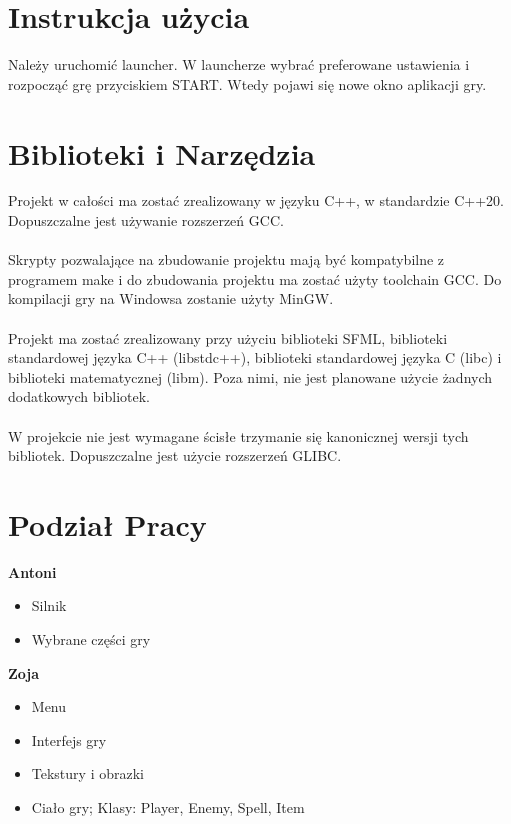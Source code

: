 \documentclass[12pt, titlepage]{article}
\begin{document}
\newpage
\section{Instrukcja użycia}
Należy uruchomić launcher. W
launcherze wybrać preferowane
ustawienia i rozpocząć grę
przyciskiem START. Wtedy pojawi
się nowe okno aplikacji gry.

\section{Biblioteki i Narzędzia}
Projekt w całości ma zostać zrealizowany
w języku C++, w standardzie C++20.
Dopuszczalne jest używanie rozszerzeń
GCC.
\\~\\
Skrypty pozwalające na zbudowanie
projektu mają być kompatybilne z
programem make i do zbudowania
projektu ma zostać użyty toolchain
GCC. Do kompilacji gry na Windowsa
zostanie użyty MinGW.
\\~\\
Projekt ma zostać zrealizowany przy
użyciu biblioteki SFML, biblioteki
standardowej języka C++ (libstdc++),
biblioteki standardowej języka C (libc)
i biblioteki matematycznej (libm). Poza
nimi, nie jest planowane użycie żadnych
dodatkowych bibliotek.
\\~\\
W projekcie nie jest wymagane ścisłe
trzymanie się kanonicznej wersji tych
bibliotek. Dopuszczalne jest użycie
rozszerzeń GLIBC.

\section{Podział Pracy}
\textbf{Antoni}
\begin{itemize}
	\item Silnik
	\item Wybrane części gry
\end{itemize}
 
\noindent
\textbf{Zoja}
\begin{itemize}
	\item Menu
	\item Interfejs gry
	\item Tekstury i obrazki
	\item Ciało gry; Klasy: Player, Enemy, Spell, Item
\end{itemize}
\end{document}
